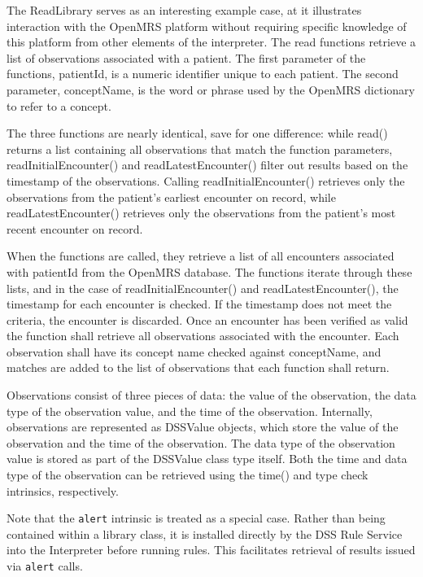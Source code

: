 \documentclass[12pt,letterpaper]{article}
\begin{document}
{The ReadLibrary serves as an interesting example case, at it illustrates interaction with the OpenMRS platform without requiring specific knowledge of this platform from other elements of the interpreter. The read functions retrieve a list of observations associated with a patient. The first parameter of the functions, patientId, is a numeric identifier unique to each patient. The second parameter, conceptName, is the word or phrase used by the OpenMRS dictionary to refer to a concept. 

The three functions are nearly identical, save for one difference: while read() returns a list containing all observations that match the function parameters, readInitialEncounter() and readLatestEncounter() filter out results based on the timestamp of the observations. Calling readInitialEncounter() retrieves only the observations from the patient's earliest encounter on record, while readLatestEncounter() retrieves only the observations from the patient's most recent encounter on record. 

When the functions are called, they retrieve a list of all encounters associated with patientId from the OpenMRS database. The functions iterate through these lists, and in the case of readInitialEncounter() and readLatestEncounter(), the timestamp for each encounter is checked. If the timestamp does not meet the criteria, the encounter is discarded. Once an encounter has been verified as valid the function shall retrieve all observations associated with the encounter. Each observation shall have its concept name checked against conceptName, and matches are added to the list of observations that each function shall return. 

Observations consist of three pieces of data: the value of the observation, the data type of the observation value, and the time of the observation. Internally, observations are represented as DSSValue objects, which store the value of the observation and the time of the observation. The data type of the observation value is stored as part of the DSSValue class type itself. Both the time and data type of the observation can be retrieved using the time() and type check intrinsics, respectively. 

Note that the \texttt{alert} intrinsic is treated as a special case. Rather than being contained within a library class, it is installed directly by the DSS Rule Service into the Interpreter before running rules. This facilitates retrieval of results issued via \texttt{alert} calls.

}
\end{document}
